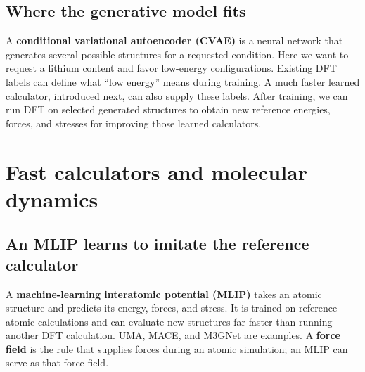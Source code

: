 \begin{center}
\end{center}

\subsection*{Where the generative model fits}
A \textbf{conditional variational autoencoder (CVAE)} is a neural network that generates several possible structures for a requested condition. Here we want to request a lithium content and favor low-energy configurations. Existing DFT labels can define what ``low energy'' means during training. A much faster learned calculator, introduced next, can also supply these labels. After training, we can run DFT on selected generated structures to obtain new reference energies, forces, and stresses for improving those learned calculators.


\clearpage
\section{Fast calculators and molecular dynamics}

\subsection*{An MLIP learns to imitate the reference calculator}
A \textbf{machine-learning interatomic potential (MLIP)} takes an atomic structure and predicts its energy, forces, and stress. It is trained on reference atomic calculations and can evaluate new structures far faster than running another DFT calculation. UMA, MACE, and M3GNet are examples. A \textbf{force field} is the rule that supplies forces during an atomic simulation; an MLIP can serve as that force field.

